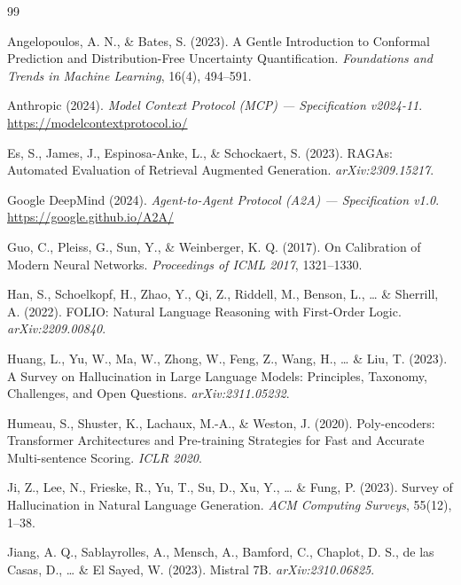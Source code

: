 \documentclass[12pt,a4paper]{article}
\begin{document}

\begin{thebibliography}{99}

Angelopoulos, A. N., \& Bates, S. (2023).
\newblock A Gentle Introduction to Conformal Prediction and Distribution-Free Uncertainty Quantification.
\newblock \textit{Foundations and Trends in Machine Learning}, 16(4), 494--591.

Anthropic (2024).
\newblock \textit{Model Context Protocol (MCP) --- Specification v2024-11}.
\newblock \url{https://modelcontextprotocol.io/}

Es, S., James, J., Espinosa-Anke, L., \& Schockaert, S. (2023).
\newblock RAGAs: Automated Evaluation of Retrieval Augmented Generation.
\newblock \textit{arXiv:2309.15217}.

Google DeepMind (2024).
\newblock \textit{Agent-to-Agent Protocol (A2A) --- Specification v1.0}.
\newblock \url{https://google.github.io/A2A/}

Guo, C., Pleiss, G., Sun, Y., \& Weinberger, K. Q. (2017).
\newblock On Calibration of Modern Neural Networks.
\newblock \textit{Proceedings of ICML 2017}, 1321--1330.

Han, S., Schoelkopf, H., Zhao, Y., Qi, Z., Riddell, M., Benson, L., \ldots{} \& Sherrill, A. (2022).
\newblock FOLIO: Natural Language Reasoning with First-Order Logic.
\newblock \textit{arXiv:2209.00840}.

Huang, L., Yu, W., Ma, W., Zhong, W., Feng, Z., Wang, H., \ldots{} \& Liu, T. (2023).
\newblock A Survey on Hallucination in Large Language Models: Principles, Taxonomy, Challenges, and Open Questions.
\newblock \textit{arXiv:2311.05232}.

Humeau, S., Shuster, K., Lachaux, M.-A., \& Weston, J. (2020).
\newblock Poly-encoders: Transformer Architectures and Pre-training Strategies for Fast and Accurate Multi-sentence Scoring.
\newblock \textit{ICLR 2020}.

Ji, Z., Lee, N., Frieske, R., Yu, T., Su, D., Xu, Y., \ldots{} \& Fung, P. (2023).
\newblock Survey of Hallucination in Natural Language Generation.
\newblock \textit{ACM Computing Surveys}, 55(12), 1--38.

Jiang, A. Q., Sablayrolles, A., Mensch, A., Bamford, C., Chaplot, D. S., de las Casas, D., \ldots{} \& El Sayed, W. (2023).
\newblock Mistral 7B.
\newblock \textit{arXiv:2310.06825}.


\end{thebibliography}
\end{document}
